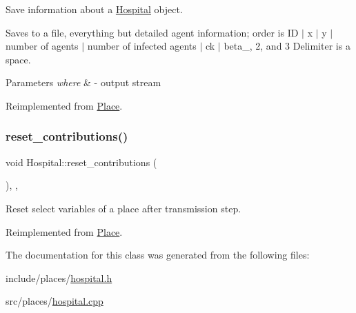 Save information about a \hyperlink{classHospital}{Hospital} object. 

Saves to a file, everything but detailed agent information; order is ID $\vert$ x $\vert$ y $\vert$ number of agents $\vert$ number of infected agents $\vert$ ck $\vert$ beta\+\_, 2, and 3 Delimiter is a space. 
\begin{DoxyParams}{Parameters}
{\em where} & -\/ output stream \\
\hline
\end{DoxyParams}


Reimplemented from \hyperlink{classPlace_a9aa7649e0b91c5f61a5f71e9ca808fe1}{Place}.

\mbox{\label{classHospital_a928d185dde78d0bce3034b7a138b472d}} 
\subsubsection{\texorpdfstring{reset\+\_\+contributions()}{reset\_contributions()}}
{\footnotesize\ttfamily void Hospital\+::reset\+\_\+contributions (\begin{DoxyParamCaption}{ }\end{DoxyParamCaption})\hspace{0.3cm}{\ttfamily [inline]}, {\ttfamily [override]}, {\ttfamily [virtual]}}



Reset select variables of a place after transmission step. 



Reimplemented from \hyperlink{classPlace_abc1e560ef8aaaad565ccceb9540e5bd8}{Place}.



The documentation for this class was generated from the following files\+:\begin{DoxyCompactItemize}
\item 
include/places/\hyperlink{hospital_8h}{hospital.\+h}\item 
src/places/\hyperlink{hospital_8cpp}{hospital.\+cpp}\end{DoxyCompactItemize}

